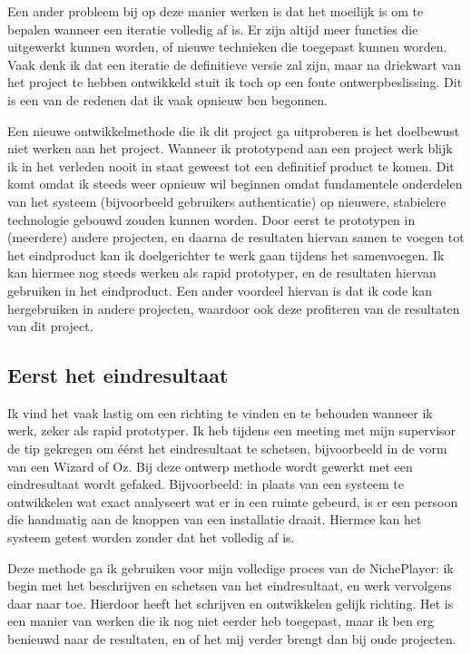 Een ander probleem bij op deze manier werken is dat het moeilijk is om te bepalen wanneer een iteratie volledig af is. Er zijn altijd meer functies die uitgewerkt kunnen worden, of nieuwe technieken die toegepast kunnen worden. Vaak denk ik dat een iteratie de definitieve versie zal zijn, maar na driekwart van het project te hebben ontwikkeld stuit ik toch op een foute ontwerpbeslissing. Dit is een van de redenen dat ik vaak opnieuw ben begonnen.

Een nieuwe ontwikkelmethode die ik dit project ga uitproberen is het doelbewust niet werken aan het project. Wanneer ik prototypend aan een project werk blijk ik in het verleden nooit in staat geweest tot een definitief product te komen. Dit komt omdat ik steeds weer opnieuw wil beginnen omdat fundamentele onderdelen van het systeem (bijvoorbeeld gebruikers authenticatie) op nieuwere, stabielere technologie gebouwd zouden kunnen worden. Door eerst te prototypen in (meerdere) andere projecten, en daarna de resultaten hiervan samen te voegen tot het eindproduct kan ik doelgerichter te werk gaan tijdens het samenvoegen. Ik kan hiermee nog steeds werken als rapid prototyper, en de resultaten hiervan gebruiken in het eindproduct. Een ander voordeel hiervan is dat ik code kan hergebruiken in andere projecten, waardoor ook deze profiteren van de resultaten van dit project.

\subsection{Eerst het eindresultaat}
Ik vind het vaak lastig om een richting te vinden en te behouden wanneer ik werk, zeker als rapid prototyper. Ik heb tijdens een meeting met mijn supervisor de tip gekregen om éérst het eindresultaat te schetsen, bijvoorbeeld in de vorm van een Wizard of Oz. Bij deze ontwerp methode wordt gewerkt met een eindresultaat wordt gefaked. Bijvoorbeeld: in plaats van een systeem te ontwikkelen wat exact analyseert wat er in een ruimte gebeurd, is er een persoon die handmatig aan de knoppen van een installatie draait. Hiermee kan het systeem getest worden zonder dat het volledig af is.

Deze methode ga ik gebruiken voor mijn volledige proces van de NichePlayer: ik begin met het beschrijven en schetsen van het eindresultaat, en werk vervolgens daar naar toe. Hierdoor heeft het schrijven en ontwikkelen gelijk richting. Het is een manier van werken die ik nog niet eerder heb toegepast, maar ik ben erg benieuwd naar de resultaten, en of het mij verder brengt dan bij oude projecten.

